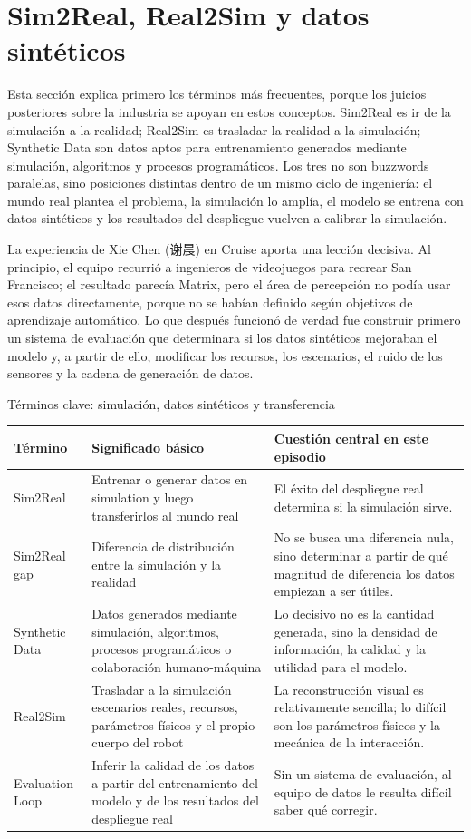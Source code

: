 \documentclass[a4paper]{article}
\begin{document}
\section{Sim2Real, Real2Sim y datos sintéticos}

Esta sección explica primero los términos más frecuentes, porque los juicios posteriores sobre la industria se apoyan en estos conceptos. Sim2Real es ir de la simulación a la realidad; Real2Sim es trasladar la realidad a la simulación; Synthetic Data son datos aptos para entrenamiento generados mediante simulación, algoritmos y procesos programáticos. Los tres no son buzzwords paralelas, sino posiciones distintas dentro de un mismo ciclo de ingeniería: el mundo real plantea el problema, la simulación lo amplía, el modelo se entrena con datos sintéticos y los resultados del despliegue vuelven a calibrar la simulación.

La experiencia de Xie Chen (谢晨) en Cruise aporta una lección decisiva. Al principio, el equipo recurrió a ingenieros de videojuegos para recrear San Francisco; el resultado parecía Matrix, pero el área de percepción no podía usar esos datos directamente, porque no se habían definido según objetivos de aprendizaje automático. Lo que después funcionó de verdad fue construir primero un sistema de evaluación que determinara si los datos sintéticos mejoraban el modelo y, a partir de ello, modificar los recursos, los escenarios, el ruido de los sensores y la cadena de generación de datos.

\begin{knowledgebox}{Términos clave: simulación, datos sintéticos y transferencia}
\begin{tabularx}{\textwidth}{p{}p{}X}
\toprule
Término & Significado básico & Cuestión central en este episodio \\
\midrule
Sim2Real & Entrenar o generar datos en simulation y luego transferirlos al mundo real & El éxito del despliegue real determina si la simulación sirve. \\
Sim2Real gap & Diferencia de distribución entre la simulación y la realidad & No se busca una diferencia nula, sino determinar a partir de qué magnitud de diferencia los datos empiezan a ser útiles. \\
Synthetic Data & Datos generados mediante simulación, algoritmos, procesos programáticos o colaboración humano-máquina & Lo decisivo no es la cantidad generada, sino la densidad de información, la calidad y la utilidad para el modelo. \\
Real2Sim & Trasladar a la simulación escenarios reales, recursos, parámetros físicos y el propio cuerpo del robot & La reconstrucción visual es relativamente sencilla; lo difícil son los parámetros físicos y la mecánica de la interacción. \\
Evaluation Loop & Inferir la calidad de los datos a partir del entrenamiento del modelo y de los resultados del despliegue real & Sin un sistema de evaluación, al equipo de datos le resulta difícil saber qué corregir. \\
\bottomrule
\end{tabularx}
\end{knowledgebox}
\end{document}

